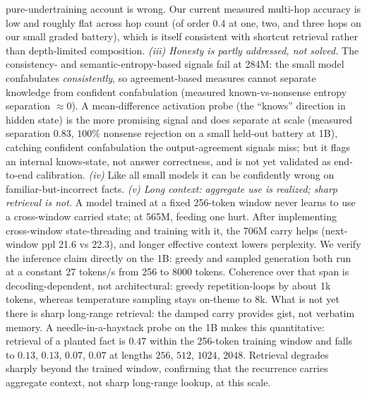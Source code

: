 \documentclass[10pt,twocolumn]{article}
\begin{document}
pure-undertraining account is wrong. Our current measured multi-hop accuracy is low and roughly flat across hop count (of order $0.4$ at one, two, and three hops on our small graded battery), which is itself consistent with shortcut retrieval rather than depth-limited composition. \emph{(iii) Honesty is partly addressed, not solved.} The consistency- and semantic-entropy-based signals fail at 284M: the small model confabulates \emph{consistently}, so agreement-based measures cannot separate knowledge from confident confabulation (measured known-vs-nonsense entropy separation $\approx 0$). A mean-difference activation probe (the ``knows'' direction in hidden state) is the more promising signal and does separate at scale (measured separation $0.83$, $100\%$ nonsense rejection on a small held-out battery at 1B), catching confident confabulation the output-agreement signals miss; but it flags an internal knows-state, not answer correctness, and is not yet validated as end-to-end calibration. \emph{(iv)} Like all small models it can be confidently wrong on familiar-but-incorrect facts. \emph{(v) Long context: aggregate use is realized; sharp retrieval is not.} A model trained at a fixed 256-token window never learns to use a cross-window carried state; at 565M, feeding one hurt. After implementing cross-window state-threading and training with it, the 706M carry helps (next-window ppl 21.6 vs 22.3), and longer effective context lowers perplexity. We verify the inference claim directly on the 1B: greedy and sampled generation both run at a constant 27 tokens/s from 256 to 8000 tokens. Coherence over that span is decoding-dependent, not architectural: greedy repetition-loops by about 1k tokens, whereas temperature sampling stays on-theme to 8k. What is not yet there is sharp long-range retrieval: the damped carry provides gist, not verbatim memory. A needle-in-a-haystack probe on the 1B makes this quantitative: retrieval of a planted fact is $0.47$ within the 256-token training window and falls to $0.13$, $0.13$, $0.07$, $0.07$ at lengths $256$, $512$, $1024$, $2048$. Retrieval degrades sharply beyond the trained window, confirming that the recurrence carries aggregate context, not sharp long-range lookup, at this scale.
\end{document}
